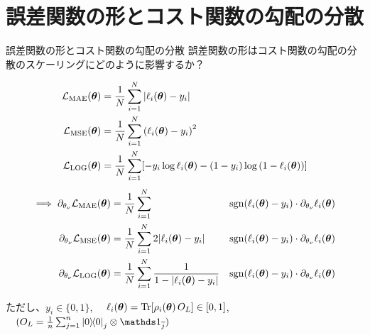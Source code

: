 \documentclass[dvipdfmx,10pt,aspectratio=169]{beamer}
\begin{document}
\section{誤差関数の形とコスト関数の勾配の分散}
\begin{frame}{誤差関数の形とコスト関数の勾配の分散}
    誤差関数の形はコスト関数の勾配の分散のスケーリングにどのように影響するか？
    \begin{footnotesize}
        \begin{align*}
            \mathcal{L}_{\mathrm{MAE}}(\vb*{\theta}) &= \frac1N\sum_{i=1}^N \abs{\ell_i(\vb*{\theta}) - y_i} \\
            \mathcal{L}_{\mathrm{MSE}}(\vb*{\theta}) &= \frac1N\sum_{i=1}^N \qty(\ell_i(\vb*{\theta}) - y_i)^2 \\
            \mathcal{L}_{\mathrm{LOG}}(\vb*{\theta}) &= \frac1N\sum_{i=1}^N [-y_i \log{\ell_i(\vb*{\theta})} - (1-y_i)\log{(1-\ell_i(\vb*{\theta}))}] \\
        \end{align*}
        \vspace{-25pt}
        \begin{alignat*}{2}
            \implies
            \partial_{\theta_\nu} \mathcal{L}_{\mathrm{MAE}}(\vb*{\theta}) &= \frac1N\sum_{i=1}^N &\operatorname{sgn}(\ell_i(\vb*{\theta}) - y_i) \cdot\partial_{\theta_\nu} \ell_i(\vb*{\theta}) \\
            \partial_{\theta_\nu} \mathcal{L}_{\mathrm{MSE}}(\vb*{\theta}) &= \frac1N\sum_{i=1}^N 2|\ell_i(\vb*{\theta}) - y_i| &\operatorname{sgn}(\ell_i(\vb*{\theta}) - y_i)\cdot\partial_{\theta_\nu} \ell_i(\vb*{\theta}) \\
            \partial_{\theta_\nu} \mathcal{L}_{\mathrm{LOG}}(\vb*{\theta}) &= \frac1N\sum_{i=1}^N \frac{1}{1 - |\ell_i(\vb*{\theta}) - y_i|} &\operatorname{sgn}(\ell_i(\vb*{\theta}) - y_i) \cdot\partial_{\theta_\nu} \ell_i(\vb*{\theta}) 
        \end{alignat*}
    \end{footnotesize}
    \begin{center}
        ただし、$y_i \in \{0,1\}$, $\quad \ell_i(\vb*{\theta}) = \Tr[\rho_i(\vb*{\theta})\,O_L] \in [0,1]$,   $\quad (O_L = \frac1n \sum_{j=1}^{n}\dyad{0}_{j} \otimes \bbid_{\bar{j}})$
    \end{center}
\end{frame}
\end{document}
